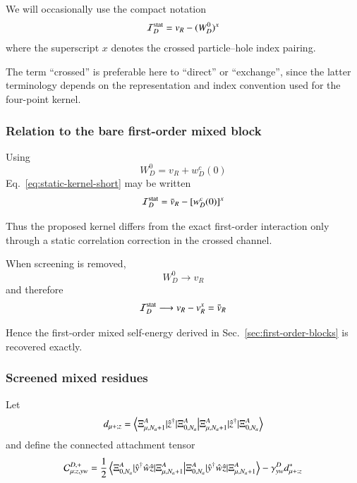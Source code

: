 \documentclass[aip,jcp,reprint,noshowkeys,superscriptaddress]{revtex4-1}
\begin{document}
We will occasionally use the compact notation
\begin{equation}
  \mathcal I_D^{\rm stat}
  =
  v_R
  -
  (W_D^0)^x
  \label{eq:static-kernel-short}
\end{equation}
where the superscript $x$ denotes the crossed particle--hole index
pairing.

The term ``crossed'' is preferable here to ``direct'' or ``exchange'',
since the latter terminology depends on the representation and index
convention used for the four-point kernel.


\subsubsection{Relation to the bare first-order mixed block}

Using
\begin{equation}
  W_D^0
  =
  v_R
  +
  w_D^c(0)
\end{equation}
Eq.~\eqref{eq:static-kernel-short} may be written
\begin{equation}
  \mathcal I_D^{\rm stat}
  =
  \bar v_R
  -
  [w_D^c(0)]^x
  \label{eq:kernel-bare-plus-screening}
\end{equation}

Thus the proposed kernel differs from the exact first-order interaction
only through a static correlation correction in the crossed channel.

When screening is removed,
\begin{equation}
  W_D^0
  \longrightarrow
  v_R
\end{equation}
and therefore
\begin{equation}
  \mathcal I_D^{\rm stat}
  \longrightarrow
  v_R-v_R^x
  =
  \bar v_R
  \label{eq:kernel-bare-limit}
\end{equation}

Hence the first-order mixed self-energy derived in Sec.~\ref{sec:first-order-blocks} is recovered exactly.


\subsubsection{Screened mixed residues}

Let
\begin{equation}
  d_{\mu+;z}
  =
  \braket{
    \Xi_{\mu,N_a+1}^{A}
    |
    \hat z^\dagger
    |
    \Xi_{0,N_a}^{A}
  }
\end{equation}
and define the connected attachment tensor
\begin{equation}
  \mathcal C_{\mu;z,yw}^{D,+}
  =
  \frac12
  \braket{
    \Xi_{0,N_a}^{A}
    |
    \hat y^\dagger\hat w\hat z
    |
    \Xi_{\mu,N_a+1}^{A}
  }
  -
  \gamma_{yw}^{D}
  d_{\mu+;z}^{*}
  \label{eq:connected-attachment-tensor}
\end{equation}
\end{document}
